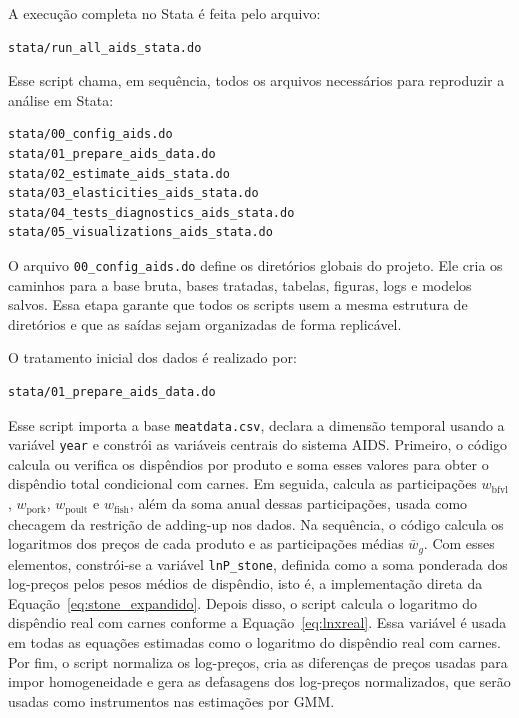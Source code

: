 \documentclass[12pt,a4paper]{article}
\begin{document}
A execução completa no Stata é feita pelo arquivo:

\begin{verbatim}
stata/run_all_aids_stata.do
\end{verbatim}

Esse script chama, em sequência, todos os arquivos necessários para reproduzir a análise em Stata:

\begin{verbatim}
stata/00_config_aids.do
stata/01_prepare_aids_data.do
stata/02_estimate_aids_stata.do
stata/03_elasticities_aids_stata.do
stata/04_tests_diagnostics_aids_stata.do
stata/05_visualizations_aids_stata.do
\end{verbatim}

O arquivo \texttt{00\_config\_aids.do} define os diretórios globais do projeto. Ele cria os caminhos para a base bruta, bases tratadas, tabelas, figuras, logs e modelos salvos. Essa etapa garante que todos os scripts usem a mesma estrutura de diretórios e que as saídas sejam organizadas de forma replicável.

O tratamento inicial dos dados é realizado por:

\begin{verbatim}
stata/01_prepare_aids_data.do
\end{verbatim}

Esse script importa a base \texttt{meatdata.csv}, declara a dimensão temporal usando a variável \texttt{year} e constrói as variáveis centrais do sistema AIDS. Primeiro, o código calcula ou verifica os dispêndios por produto e soma esses valores para obter o dispêndio total condicional com carnes. Em seguida, calcula as participações \(w_{\text{bfvl}}\), \(w_{\text{pork}}\), \(w_{\text{poult}}\) e \(w_{\text{fish}}\), além da soma anual dessas participações, usada como checagem da restrição de adding-up nos dados. Na sequência, o código calcula os logaritmos dos preços de cada produto e as participações médias \(\bar{w}_g\). Com esses elementos, constrói-se a variável \texttt{lnP\_stone}, definida como a soma ponderada dos log-preços pelos pesos médios de dispêndio, isto é, a implementação direta da Equação~\eqref{eq:stone_expandido}. Depois disso, o script calcula o logaritmo do dispêndio real com carnes conforme a Equação~\eqref{eq:lnxreal}. Essa variável é usada em todas as equações estimadas como o logaritmo do dispêndio real com carnes. Por fim, o script normaliza os log-preços, cria as diferenças de preços usadas para impor homogeneidade e gera as defasagens dos log-preços normalizados, que serão usadas como instrumentos nas estimações por GMM.
\end{document}
